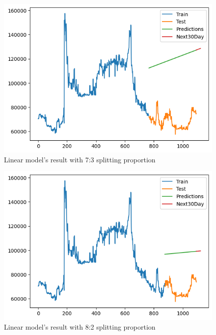 \documentclass{ieeeojies}
\begin{document}
\begin{figure}[H]
  \centering
  \begin{minipage}{0.8\linewidth}
    \centering
    \includegraphics[width=\linewidth]{bibliography/Figure/LN_DP373.png}
    \caption{Linear model's result with 7:3 splitting proportion}
    \label{fig8}
  \end{minipage}
\end{figure}

\begin{figure}[H]
  \centering
  \begin{minipage}{0.8\linewidth}
    \centering
    \includegraphics[width=\linewidth]{bibliography/Figure/LN_DP382.png}
    \caption{Linear model's result with 8:2 splitting proportion}
    \label{fig8}
  \end{minipage}
\end{figure}
\end{document}
